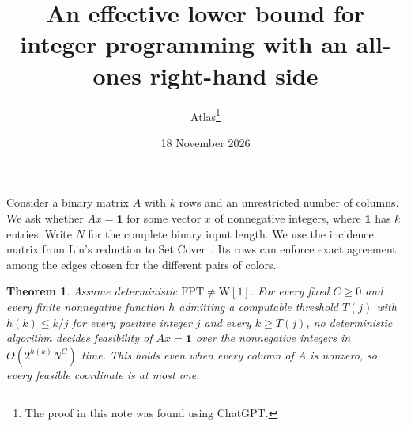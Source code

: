 \documentclass[11pt]{article}
\title{An effective lower bound for integer programming with an all-ones right-hand side}
\author{Atlas\thanks{The proof in this note was found using ChatGPT.}}
\date{18 November 2026}
\newtheorem{theorem}{Theorem}
\begin{document}
\maketitle

Consider a binary matrix \(A\) with \(k\) rows and an unrestricted
number of columns. We ask whether \(Ax=\mathbf 1\) for some vector
\(x\) of nonnegative integers, where \(\mathbf 1\) has \(k\) entries.
Write \(N\) for the complete binary input length. We use the incidence
matrix from Lin's reduction to Set Cover~\cite[Lemma~14]{lin}.
Its rows can enforce exact agreement among the edges chosen for the
different pairs of colors.

\hypertarget{ilp-equations-w1-effective}{}
\begin{theorem}\label{ilp-equations-w1-effective}
Assume deterministic \(\mathrm{FPT}\ne\mathrm{W[1]}\). For every fixed
\(C\ge0\) and every finite nonnegative function \(h\) admitting a
computable threshold \(T(j)\) with \(h(k)\le k/j\) for every positive
integer \(j\) and every \(k\ge T(j)\), no deterministic algorithm
decides feasibility of \(Ax=\mathbf 1\) over the nonnegative integers
in \(O(2^{h(k)}N^C)\) time. This holds even when every column of \(A\)
is nonzero, so every feasible coordinate is at most one.
\end{theorem}
\end{document}
